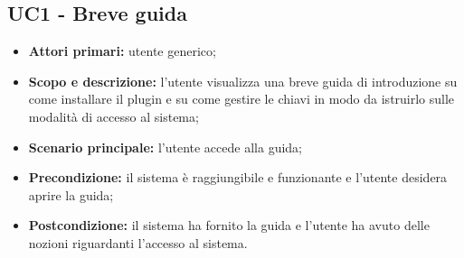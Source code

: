 \documentclass[AnalisiDeiRequisiti.tex]{subfiles}
\begin{document}

\subsection{UC1 - Breve guida}
\begin{itemize}
	\item \textbf{Attori primari:} utente generico;
	\item \textbf{Scopo e descrizione:} l'utente visualizza una breve guida di introduzione su come installare il plugin  e su come gestire le chiavi in modo da istruirlo sulle modalità di accesso al sistema;
	\item \textbf{Scenario principale:} l'utente accede alla guida;
	\item \textbf{Precondizione:} il sistema è raggiungibile e funzionante e l'utente desidera aprire la guida;
	\item \textbf{Postcondizione:} il sistema ha fornito la guida e l'utente ha avuto delle nozioni riguardanti l'accesso al sistema.
\end{itemize}
\end{document}
